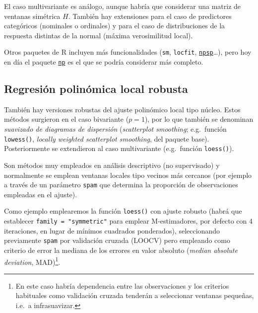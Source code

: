 \documentclass[
]{book}
\theoremstyle{break}
\theoremstyle{definition}
\theoremstyle{definition}
\theoremstyle{definition}
\theoremstyle{definition}
\theoremstyle{remark}
\begin{document}
El caso multivariante es análogo, aunque habría que considerar una matriz de ventanas simétrica \(H\). También hay extensiones para el caso de predictores categóricos (nominales o ordinales) y para el caso de distribuciones de la respuesta distintas de la normal (máxima verosimilitud local).

Otros paquetes de R incluyen más funcionalidades (\texttt{sm}, \texttt{locfit}, \href{https://rubenfcasal.github.io/npsp}{\texttt{npsp}}\ldots), pero hoy en día el paquete \href{https://github.com/JeffreyRacine/R-Package-np}{\texttt{np}} es el que se podría considerar más completo.

\hypertarget{regresiuxf3n-polinuxf3mica-local-robusta}{%
\subsection{Regresión polinómica local robusta}\label{regresiuxf3n-polinuxf3mica-local-robusta}}

También hay versiones robustas del ajuste polinómico local tipo núcleo.
Estos métodos surgieron en el caso bivariante (\(p=1\)), por lo que también se denominan \emph{suavizado de diagramas de dispersión} (\emph{scatterplot smoothing}; e.g.~función \texttt{lowess()}, \emph{locally weighted scatterplot smoothing}, del paquete base).
Posteriormente se extendieron al caso multivariante (e.g.~función \texttt{loess()}).

Son métodos muy empleados en análisis descriptivo (no supervisado) y normalmente se emplean ventanas locales tipo vecinos más cercanos (por ejemplo a través de un parámetro \texttt{spam} que determina la proporción de observaciones empleadas en el ajuste).

Como ejemplo emplearemos la función \texttt{loess()} con ajuste robusto (habrá que establecer \texttt{family\ =\ "symmetric"} para emplear M-estimadores, por defecto con 4 iteraciones, en lugar de mínimos cuadrados ponderados), seleccionando previamente \texttt{spam} por validación cruzada (LOOCV) pero empleando como criterio de error la mediana de los errores en valor absoluto (\emph{median absolute deviation}, MAD)\footnote{En este caso habría dependencia entre las observaciones y los criterios habituales como validación cruzada tenderán a seleccionar ventanas pequeñas, i.e.~a infrasuavizar.}.
\end{document}
